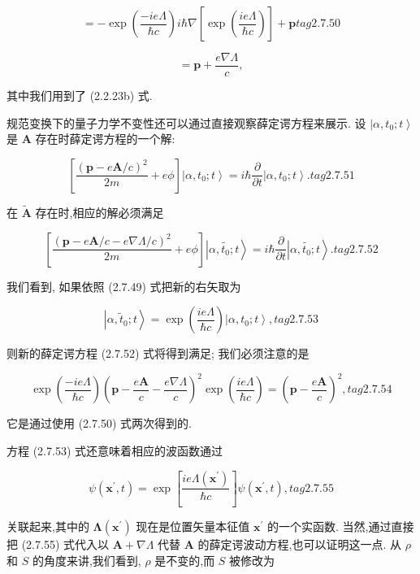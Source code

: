 \documentclass[lang=cn,newtx,10pt,scheme=chinese,thmcnt=section]{elegantbook}
\begin{document}
$$
= - \exp \left( \frac{-{ie\Lambda }}{\hbar c}\right) i\hbar \nabla \left\lbrack {\exp \left( \frac{ie\Lambda }{\hbar c}\right) }\right\rbrack + \mathbf{p} tag{2.7.50}
$$

$$
= \mathbf{p} + \frac{e\nabla \Lambda }{c},
$$

其中我们用到了 (2.2.23b) 式.

规范变换下的量子力学不变性还可以通过直接观察薛定谔方程来展示. 设 $\left| {\alpha ,{t}_{0};t}\right\rangle$ 是 $\mathbf{A}$ 存在时薛定谔方程的一个解:

$$
\left\lbrack {\frac{{\left( \mathbf{p} - e\mathbf{A}/c\right) }^{2}}{2m} + {e\phi }}\right\rbrack \left| {\alpha ,{t}_{0};t}\right\rangle = i\hbar \frac{\partial }{\partial t}\left| {\alpha ,{t}_{0};t}\right\rangle . tag{2. 7.51}
$$

在 $\widetilde{\mathbf{A}}$ 存在时,相应的解必须满足

$$
\left\lbrack {\frac{{\left( \mathbf{p} - e\mathbf{A}/c - e\nabla \Lambda /c\right) }^{2}}{2m} + {e\phi }}\right\rbrack \left| {\alpha ,\widetilde{{t}_{0}};t}\right\rangle = i\hbar \frac{\partial }{\partial t}\left| {\alpha ,\widetilde{{t}_{0}};t}\right\rangle . tag{2. 7.52}
$$

我们看到, 如果依照 (2.7.49) 式把新的右矢取为

$$
\left| {\alpha ,{\widetilde{t}}_{0};t}\right\rangle = \exp \left( \frac{ie\Lambda }{\hbar c}\right) \left| {\alpha ,{t}_{0};t}\right\rangle , tag{2. 7.53}
$$

则新的薛定谔方程 (2.7.52) 式将得到满足; 我们必须注意的是

$$
\exp \left( \frac{-{ie\Lambda }}{\hbar c}\right) {\left( \mathbf{p} - \frac{e\mathbf{A}}{c} - \frac{e\nabla \Lambda }{c}\right) }^{2}\exp \left( \frac{ie\Lambda }{\hbar c}\right) = {\left( \mathbf{p} - \frac{e\mathbf{A}}{c}\right) }^{2}, tag{2. 7.54}
$$

它是通过使用 (2.7.50) 式两次得到的.

方程 (2.7.53) 式还意味着相应的波函数通过

$$
\psi \left( {{\mathbf{x}}^{\prime }, t}\right) = \exp \left\lbrack \frac{{ie\Lambda }\left( {\mathbf{x}}^{\prime }\right) }{\hbar c}\right\rbrack \psi \left( {{\mathbf{x}}^{\prime }, t}\right) , tag{2. 7.55}
$$

关联起来,其中的 $\mathbf{\Lambda }\left( {\mathbf{x}}^{\prime }\right)$ 现在是位置矢量本征值 ${\mathbf{x}}^{\prime }$ 的一个实函数. 当然,通过直接把 (2.7.55) 式代入以 $\mathbf{A} + \nabla \Lambda$ 代替 $\mathbf{A}$ 的薛定谔波动方程,也可以证明这一点. 从 $\rho$ 和 $S$ 的角度来讲,我们看到, $\rho$ 是不变的,而 $S$ 被修改为
\end{document}
